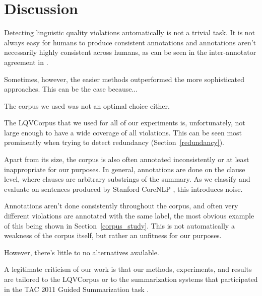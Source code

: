 \documentclass[a4paper,10pt]{scrartcl}
\theoremstyle{style}
\begin{document}
\section{Discussion}
\label{discussion}
Detecting linguistic quality violations automatically is not a trivial task. It is not always easy for humans to produce consistent annotations and annotations aren't necessarily highly consistent across humans, as can be seen in the inter-annotator agreement in \cite{friedrichlqvsumm}.

Sometimes, however, the easier methods outperformed the more sophisticated approaches. This can be the case because...


The corpus we used was not an optimal choice either.

The LQVCorpus that we used for all of our experiments is, unfortunately, not large enough to have a wide coverage of all violations. This can be seen most prominently when trying to detect redundancy (Section~\ref{redundancy}).

Apart from its size, the corpus is also often annotated inconsistently or at least inappropriate for our purposes. In general, annotations are done on the clause level, where clauses are arbitrary substrings of the summary. As we classify and evaluate on sentences produced by Stanford CoreNLP \citep{manning-EtAl:2014:P14-5}, this introduces noise.

Annotations aren't done consistently throughout the corpus, and often very different violations are annotated with the same label, the most obvious example of this being shown in Section~\ref{corpus_study}. This is not automatically a weakness of the corpus itself, but rather an unfitness for our purposes.

However, there's little to no alternatives available.

A legitimate criticism of our work is that our methods, experiments, and results are tailored to the LQVCorpus or to the summarization systems that participated in the TAC 2011 Guided Summarization task \citep{owczarzak2011overview}.

\end{document}
